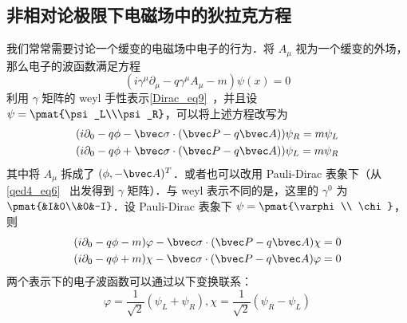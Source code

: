 \subsection{非相对论极限下电磁场中的狄拉克方程}\label{DiracE_sub1}
我们常常需要讨论一个缓变的电磁场中电子的行为．将 $A_\mu$ 视为一个缓变的外场，那么电子的波函数满足方程
\begin{equation}\label{DiracE_eq4}
(i\gamma^\mu \partial_\mu -q\gamma^\mu A_\mu - m)\psi(x)=0
\end{equation}
利用 $\gamma$ 矩阵的 weyl 手性表示\autoref{Dirac_eq9}~，并且设 $\psi = \pmat{\psi_L\\\psi_R}$，可以将上述方程改写为
\begin{equation}
\begin{aligned}
&(i\partial_0 - q\phi-\bvec \sigma\cdot (\bvec P-q\bvec A))\psi_R=m\psi_L\\
&(i\partial_0-q\phi+\bvec \sigma\cdot (\bvec P-q\bvec A))\psi_L = m\psi_R
\end{aligned}
\end{equation}
其中将 $A_\mu$ 拆成了 $(\phi,-\bvec A)^T$．或者也可以改用 Pauli-Dirac 表象下（从 \autoref{qed4_eq6}~ 出发得到 $\gamma$ 矩阵）．与 weyl 表示不同的是，这里的 $\gamma^0$ 为 $\pmat{&I&0\\&0&-I}$．设 Pauli-Dirac 表象下 $\psi=\pmat{\varphi\\ \chi}$，则
\begin{equation}\label{DiracE_eq1}
\begin{aligned}
&(i\partial_0-q\phi-m)\varphi-\bvec \sigma\cdot (\bvec P-q\bvec A)\chi=0\\
&(i\partial_0-q\phi+m)\chi-\bvec \sigma\cdot (\bvec P-q\bvec A)\varphi=0
\end{aligned}
\end{equation}
两个表示下的电子波函数可以通过以下变换联系：
\begin{equation}
\varphi = \frac{1}{\sqrt{2}}(\psi_L+\psi_R),\chi = \frac{1}{\sqrt{2}}(\psi_R-\psi_L)
\end{equation}

